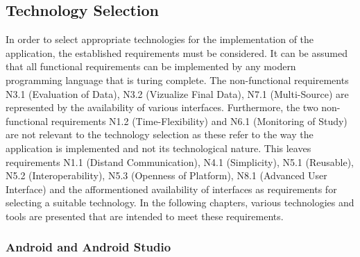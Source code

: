 \subsection{Technology Selection}

In order to select appropriate technologies for the implementation of the application, the established requirements must be considered. It can be assumed that all functional requirements can be implemented by any modern programming language that is turing complete. The non-functional requirements N3.1 (Evaluation of Data), N3.2 (Vizualize Final Data), N7.1 (Multi-Source) are represented by the availability of various interfaces. Furthermore, the two non-functional requirements N1.2 (Time-Flexibility) and N6.1 (Monitoring of Study) are not relevant to the technology selection as these refer to the way the application is implemented and not its technological nature. This leaves requirements N1.1 (Distand Communication),  N4.1 (Simplicity), N5.1 (Reusable), N5.2 (Interoperability), N5.3 (Openness of Platform), N8.1 (Advanced User Interface) and the afformentioned availability of interfaces as requirements for selecting a suitable technology. In the following chapters, various technologies and tools are presented that are intended to meet these requirements.



\subsubsection{Android and Android Studio}

